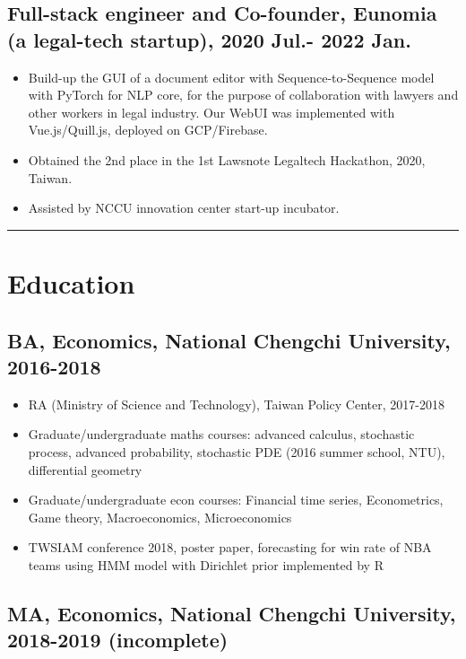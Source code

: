 \documentclass[11pt]{article}
\begin{document}
\begin{multicols*}{2}
\vspace{2em}

\subsection*{Full-stack engineer and Co-founder, Eunomia (a legal-tech startup), 2020 Jul.- 2022 Jan.}
\begin{itemize}[noitemsep]
    \item Build-up the GUI of a document editor with Sequence-to-Sequence model with PyTorch for NLP core, for the purpose of collaboration with lawyers and other workers in legal industry. Our WebUI was implemented with Vue.js/Quill.js, deployed on GCP/Firebase.
    \item Obtained the 2nd place in the 1st Lawsnote Legaltech Hackathon, 2020, Taiwan.
    \item Assisted by NCCU innovation center start-up incubator.
\end{itemize}

\hrule

\section*{Education}

\subsection*{BA, Economics, National Chengchi University, 2016-2018}

    \begin{itemize}[noitemsep]
        \item RA (Ministry of Science and Technology), Taiwan Policy Center, 2017-2018
        \item Graduate/undergraduate maths courses: advanced calculus, stochastic process, advanced probability, stochastic PDE (2016 summer school, NTU), differential geometry
        \item Graduate/undergraduate econ courses: Financial time series, Econometrics, Game theory, Macroeconomics, Microeconomics
        \item TWSIAM conference 2018, poster paper, forecasting for win rate of NBA teams using HMM model with Dirichlet prior implemented by R
    \end{itemize}


\subsection*{MA, Economics, National Chengchi University, 2018-2019 (incomplete)}


\end{multicols*}
\end{document}
